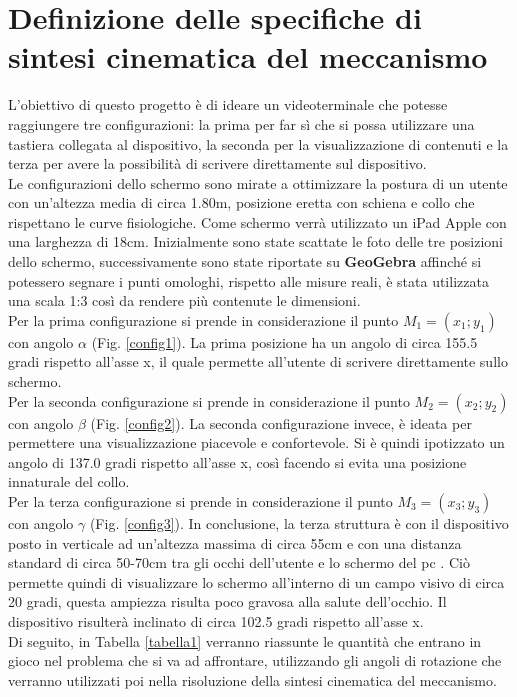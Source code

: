\documentclass{article}
\begin{document}
\section{Definizione delle specifiche di sintesi ci\-ne\-ma\-ti\-ca del meccanismo
}
L'obiettivo di questo progetto è di ideare un videoterminale che potesse raggiungere tre configurazioni: la prima per far sì che si possa utilizzare una tastiera collegata al dispositivo, la seconda per la visualizzazione di contenuti e la terza per avere la possibilità di scrivere direttamente sul dispositivo. \\
Le configurazioni dello schermo sono mirate a ottimizzare la postura di un utente con un’altezza media di circa 1.80m, posizione eretta con schiena e collo che rispettano le curve fisiologiche. Come schermo verrà utilizzato un iPad Apple con una larghezza di 18cm. Inizialmente sono state scattate le foto delle tre posizioni dello schermo, successivamente sono state riportate su \textbf{GeoGebra} affinché si potessero segnare i punti omologhi, rispetto alle misure reali, è stata utilizzata una scala 1:3 così da rendere più contenute le dimensioni.\\
Per la prima configurazione si prende in considerazione il punto $M_1 = (x_1;y_1)$ con angolo $\alpha$ (Fig. \ref{config1}). La prima posizione ha un angolo di circa 155.5 gradi rispetto all'asse x, il quale permette all'utente di scrivere direttamente sullo schermo.\\
Per la seconda configurazione si prende in considerazione il punto $M_2 = (x_2;y_2)$ con angolo $\beta$ (Fig. \ref{config2}). La seconda configurazione invece, è ideata per permettere una visualizzazione piacevole e confortevole. Si è quindi ipotizzato un angolo di 137.0 gradi rispetto all'asse x, così facendo si evita una posizione in\-na\-tu\-ra\-le del collo.\\
Per la terza configurazione si prende in considerazione il punto $M_3 = (x_3;y_3)$ con angolo $\gamma$ (Fig. \ref{config3}). In conclusione, la terza struttura è con il dispositivo posto in verticale ad un’altezza massima di circa 55cm e con una distanza standard di circa 50-70cm tra gli occhi dell'utente e lo schermo del pc \cite{testcorretta}. Ciò permette quindi di visualizzare lo schermo all'interno di un campo visivo di circa 20 gradi, questa ampiezza risulta poco gravosa alla salute dell'occhio. Il dispositivo risulterà inclinato di circa 102.5 gradi rispetto all'asse x.\\
Di seguito, in Tabella \ref{tabella1} verranno riassunte le quantità che entrano in gioco nel problema che si va ad affrontare, utilizzando gli angoli di rotazione che verranno utilizzati poi nella risoluzione della sintesi cinematica del meccanismo.
\end{document}
